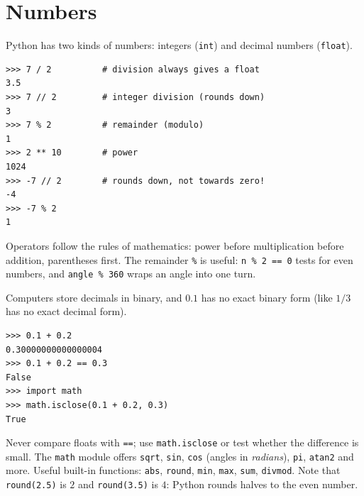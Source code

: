 \section*{Numbers}
Python has two kinds of numbers: integers (\texttt{int}) and decimal numbers (\texttt{float}).
\begin{verbatim}
>>> 7 / 2          # division always gives a float
3.5
>>> 7 // 2         # integer division (rounds down)
3
>>> 7 % 2          # remainder (modulo)
1
>>> 2 ** 10        # power
1024
>>> -7 // 2        # rounds down, not towards zero!
-4
>>> -7 % 2
1
\end{verbatim}
Operators follow the rules of mathematics: power before multiplication before addition, parentheses first. The remainder \texttt{\%} is useful: \texttt{n \% 2 == 0} tests for even numbers, and \texttt{angle \% 360} wraps an angle into one turn.

\begin{keyidea}
Computers store decimals in binary, and $0.1$ has no exact binary form (like $1/3$ has no exact decimal form).
\end{keyidea}
\begin{verbatim}
>>> 0.1 + 0.2
0.30000000000000004
>>> 0.1 + 0.2 == 0.3
False
>>> import math
>>> math.isclose(0.1 + 0.2, 0.3)
True
\end{verbatim}
Never compare floats with \texttt{==}; use \texttt{math.isclose} or test whether the difference is small. The \texttt{math} module offers \texttt{sqrt}, \texttt{sin}, \texttt{cos} (angles in \emph{radians}), \texttt{pi}, \texttt{atan2} and more. Useful built-in functions: \texttt{abs}, \texttt{round}, \texttt{min}, \texttt{max}, \texttt{sum}, \texttt{divmod}. Note that \texttt{round(2.5)} is $2$ and \texttt{round(3.5)} is $4$: Python rounds halves to the even number.

